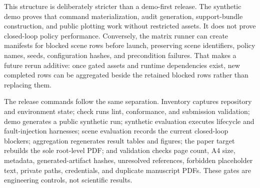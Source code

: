 \documentclass[conference,a4paper]{IEEEtran}
\begin{document}
This structure is deliberately stricter than a demo-first release. The synthetic demo
proves that command materialization, audit generation, support-bundle construction, and
public plotting work without restricted assets. It does not prove closed-loop policy
performance. Conversely, the matrix runner can create manifests for blocked scene rows
before launch, preserving scene identifiers, policy names, seeds, configuration hashes,
and precondition failures. That makes a future rerun additive: once gated assets and
runtime dependencies exist, new completed rows can be aggregated beside the retained
blocked rows rather than replacing them.

The release commands follow the same separation. Inventory captures repository and
environment state; check runs lint, conformance, and submission validation; demo
generates a public synthetic run; synthetic evaluation executes lifecycle and
fault-injection harnesses; scene evaluation records the current closed-loop blockers;
aggregation regenerates result tables and figures; the paper target rebuilds the sole
root-level PDF; and validation checks page count, A4 size, metadata, generated-artifact
hashes, unresolved references, forbidden placeholder text, private paths, credentials,
and duplicate manuscript PDFs. These gates are engineering controls, not scientific
results.



\end{document}
